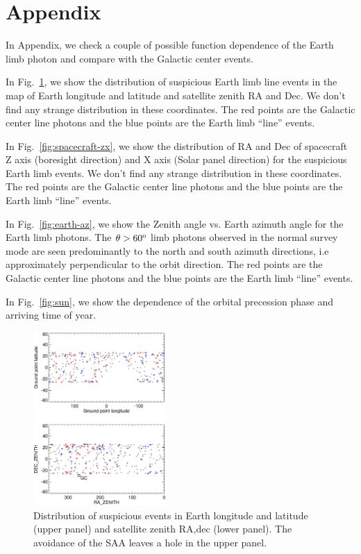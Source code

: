 \documentclass[aps,twocolumn,prd,superscriptaddress,showpacs,nofootinbib,fixfloat]{revtex4}
\newcommand{\degree}{^{\rm o}}
\begin{document}
\section{Appendix}

In Appendix, we check a couple of possible function
dependence of the Earth limb photon and compare with the
Galactic center events. 

In Fig.~\ref{fig:geo-lonlat}, we show the distribution of
suspicious Earth limb line events in the map of Earth
longitude and latitude and satellite zenith RA and Dec. We
don't find any strange distribution in these
coordinates. The red points are the Galactic center line
photons and the blue points are the Earth limb ``line''
events.

In Fig.~\ref{fig:spacecraft-zx}, we show the distribution of
RA and Dec of spacecraft Z axis (boresight direction) and X
axis (Solar panel direction) for the suspicious Earth limb
events. We don't find any strange distribution in these
coordinates. The red points are the Galactic center line
photons and the blue points are the Earth limb ``line''
events.

In Fig.~\ref{fig:earth-az}, we show the Zenith angle
vs. Earth azimuth angle for the Earth limb photons. The
$\theta > 60\degree$ limb photons observed in the normal
survey mode are seen predominantly to the north and south
azimuth directions, i.e approximately perpendicular to the
orbit direction. The red points are the Galactic center line
photons and the blue points are the Earth limb ``line''
events.

In Fig.~\ref{fig:sun}, we show the dependence of the orbital
precession phase and arriving time of year.



\begin{figure}
  \centering
  \includegraphics[width=0.45\textwidth]{plots/geo-lonlat.ps}
  \caption{Distribution of suspicious events in Earth
  longitude and latitude (upper panel) and satellite zenith
  RA,dec (lower panel).   The avoidance of the SAA leaves a
  hole in the upper panel.}
  \label{fig:geo-lonlat}
\end{figure}
\end{document}
